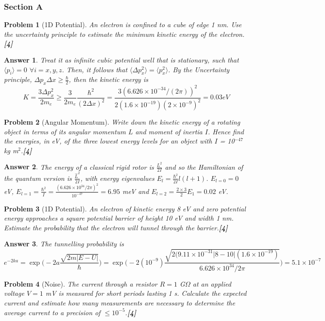 \documentclass[a4paper]{article}
\newtheorem{ans}{Answer}[subsection]
\theoremstyle{new}
\newtheorem{qns}{Problem}[subsection]
\begin{document}
\subsubsection{Section A}
\begin{qns}[1D Potential]
An electron is confined to a cube of edge 1 nm. Use the uncertainty principle to estimate the minimum kinetic energy of the electron.\hfill\textbf{[4]}
\end{qns}
\begin{ans}
Treat it as infinite cubic potential well that is stationary, such that $\langle p_i\rangle=0$ $\forall i=x,y,z$. Then, it follows that $\langle\Delta p_x^2\rangle=\langle p_x^2\rangle$. By the Uncertainty principle, $\Delta p_x\Delta x\geq\frac{\hbar}{2}$, then the kinetic energy is
$$K=\frac{3\Delta p_x^2}{2m_e}\geq\frac{3}{2m_e}\frac{\hbar^2}{(2\Delta x)^2}=\frac{3(6.626\times10^{-34}/(2\pi))^2}{2(1.6\times10^{-19})(2\times10^{-9})^2}=0.03eV$$
\end{ans}
\begin{qns}[Angular Momentum]
Write down the kinetic energy of a rotating object in terms of its angular  momentum $L$ and moment of inertia $I$. Hence find the energies, in eV, of the three lowest energy levels for an object with $I$ = 10$^{-47}$ kg m$^2$.\hfill\textbf{[4]}
\end{qns}
\begin{ans}
The energy of a classical rigid rotor is $\frac{L^2}{2I}$ and so the Hamiltonian of the quantum version is $\frac{\hat{L}^2}{2I}$, with energy eigenvalues $E_l=\frac{\hbar^2}{2I}l(l+1)$. $E_{l=0}=0$ eV, $E_{l=1}=\frac{\hbar^2}{I}=\frac{(6.626\times10^{34}/2\pi)^2}{10^{-47}}=6.95$ meV and $E_{l=2}=\frac{2\times 3}{2}E_1=0.02$ eV.
\end{ans}
\begin{qns}[1D Potential]
An electron of kinetic energy 8 eV and zero potential energy approaches a square potential barrier of height 10 eV and width 1 nm. Estimate the probability that the electron will tunnel through the barrier.\hfill\textbf{[4]}
\end{qns}
\begin{ans}
The tunnelling probability is
$$e^{-2ka}=\exp\bigg(-2a\frac{\sqrt{2m|E-U|}}{\hbar}\bigg)=\exp\bigg(-2(10^{-9})\frac{\sqrt{2(9.11\times10^{-31}|8-10|(1.6\times10^{-19})}}{6.626\times10^{34}/2\pi}\bigg)=5.1\times10^{-7}$$
\end{ans}
\begin{qns}[Noise]
The current through a resistor $R = 1$ G$\Omega$ at an applied voltage $V = 1$ mV is measured for short periods lasting 1 s. Calculate the expected current and estimate how many measurements are necessary to determine the average current to a precision of $\leq 10^{-5}$.\hfill\textbf{[4]}
\end{qns}
\end{document}
